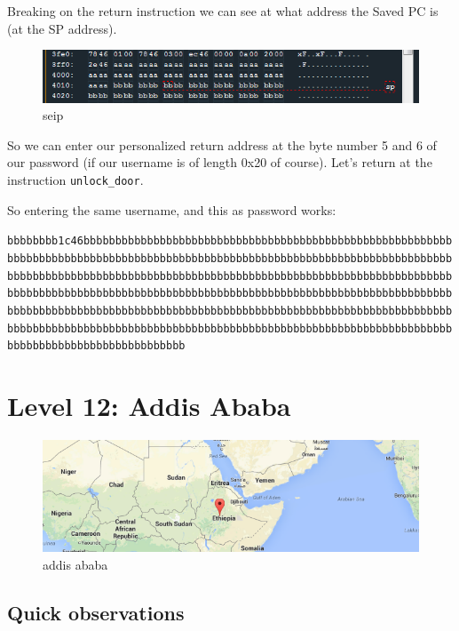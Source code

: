 \documentclass[a4paper,11pt]{article}
\begin{document}
Breaking on the return instruction we can see at what address the Saved
PC is (at the SP address).

\begin{figure}[htbp]
\centering
\includegraphics{img/11_5.PNG}
\caption{seip}
\end{figure}

So we can enter our personalized return address at the byte number 5 and
6 of our password (if our username is of length 0x20 of course). Let's
return at the instruction \texttt{unlock\_door}.

So entering the same username, and this as password works:

\texttt{bbbbbbbb1c46bbbbbbbbbbbbbbbbbbbbbbbbbbbbbbbbbbbbbbbbbbbbbbbbbbbbbbbbbbbbbbbbbbbbbbbbbbbbbbbbbbbbbbbbbbbbbbbbbbbbbbbbbbbbbbbbbbbbbbbbbbbbbbbbbbbbbbbbbbbbbbbbbbbbbbbbbbbbbbbbbbbbbbbbbbbbbbbbbbbbbbbbbbbbbbbbbbbbbbbbbbbbbbbbbbbbbbbbbbbbbbbbbbbbbbbbbbbbbbbbbbbbbbbbbbbbbbbbbbbbbbbbbbbbbbbbbbbbbbbbbbbbbbbbbbbbbbbbbbbbbbbbbbbbbbbbbbbbbbbbbbbbbbbbbbbbbbbbbbbbbbbbbbbbbbbbbbbbbbbbbbbbbbbbbbbbbbbbbbbbbbbbbbbbbbbbbbbbbbbbbbbbbbbbbbbbbbbbbbbbbbbbbbbbbbbbbbbb}

\section{Level 12: Addis Ababa}\label{level-12-addis-ababa}

\begin{figure}[htbp]
\centering
\includegraphics{img/12_1.PNG}
\caption{addis ababa}
\end{figure}

\subsection{Quick observations}\label{quick-observations}
\end{document}
